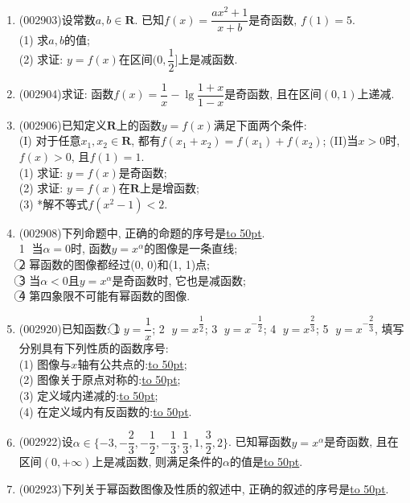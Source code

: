 \documentclass[10pt,a4paper]{article}
\newcommand{\blank}[1]{\underline{\hbox to #1pt{}}}
\newcommand{\twoch}[4]{\par\begin{tabular}{p{.46\textwidth}p{.46\textwidth}}
A.~#1& B.~#2\\
C.~#3& D.~#4
\end{tabular}}
\begin{document}
\begin{enumerate}[1.]
\twoch{\textcircled{1}和\textcircled{2}均为真命题}{\textcircled{1}和\textcircled{2}均为假命题}{\textcircled{1}为真命题, \textcircled{2}为假命题}{\textcircled{1}为假命题, \textcircled{2}为真命题}
\item {\tiny (002903)}设常数$a,b\in \mathbf{R}$. 已知$f(x)=\dfrac{ax^2+1}{x+b}$是奇函数, $f(1)=5$.\\
(1) 求$a,b$的值;\\
(2) 求证: $y=f(x)$在区间$(0,\dfrac 12]$上是减函数.
\item {\tiny (002904)}求证: 函数$f(x)=\dfrac 1x-\lg\dfrac{1+x}{1-x}$是奇函数, 且在区间$(0,1)$上递减.
\item {\tiny (002906)}已知定义$\mathbf{R}$上的函数$y=f(x)$满足下面两个条件:\\
(I) 对于任意$x_1,x_2\in \mathbf{R}$, 都有$f(x_1+x_2)=f(x_1)+f(x_2)$; (II)当$x>0$时, $f(x)>0$, 且$f(1)=1$.\\
(1) 求证: $y=f(x)$是奇函数;\\
(2) 求证: $y=f(x)$在$\mathbf{R}$上是增函数;\\
(3) *解不等式$f(x^2-1)<2$.
\item {\tiny (002908)}下列命题中, 正确的命题的序号是\blank{50}.\\
\textcircled{1} 当$\alpha =0$时, 函数$y={x^{\alpha }}$的图像是一条直线;\\
\textcircled{2} 幂函数的图像都经过(0, 0)和(1, 1)点;\\
\textcircled{3} 当$\alpha <0$且$y={x^{\alpha }}$是奇函数时, 它也是减函数;\\
\textcircled{4} 第四象限不可能有幂函数的图像.
\item {\tiny (002920)}已知函数: \textcircled{1} $y=\dfrac 1x$; \textcircled{2} $y=x^{\dfrac 12}$; \textcircled{3} $y=x^{-\dfrac 12}$; \textcircled{4} $y={x^{\dfrac 23}}$; \textcircled{5} $y=x^{-\dfrac 23}$, 填写分别具有下列性质的函数序号:\\ 
(1) 图像与$x$轴有公共点的:\blank{50};\\
(2) 图像关于原点对称的:\blank{50};\\
(3) 定义域内递减的:\blank{50};\\
(4) 在定义域内有反函数的:\blank{50}.
\item {\tiny (002922)}设$\alpha \in \{-3,-\dfrac 23,-\dfrac 12,-\dfrac 13,\dfrac 13,1,\dfrac 32,2\}$. 已知幂函数$y=x^{\alpha}$是奇函数, 且在区间$(0,+\infty)$上是减函数, 则满足条件的$\alpha$的值是\blank{50}.
\item {\tiny (002923)}下列关于幂函数图像及性质的叙述中, 正确的叙述的序号是\blank{50}.\\

\end{enumerate}
\end{document}
